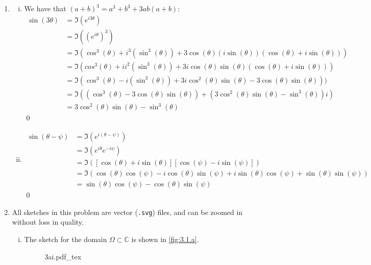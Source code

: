 \documentclass[a4paper, titlepage, DIV=14]{scrartcl}
\newcommand{\incfig}[1]{%
    \def\svgwidth{0.8\columnwidth}
    {#1.pdf_tex}
}
\begin{document}
\begin{enumerate}
        \item 
        \begin{enumerate}[i)]
            \item We have that $(a+b)^{3} = a^{3} + b^{3} +3ab(a+b)$:
            \begin{align*}
                \sin(3\theta) &= \Im(e^{i3\theta}) \\
                    &= \Im((e^{i\theta})^{3}) \\
                    &= \Im(\cos^{3}(\theta)+i^{3}(\sin^{3}(\theta)) 
                        + 3\cos(\theta)(i\sin(\theta))(\cos(\theta)+i\sin(\theta))) \\
                    &= \Im(cos^{3}(\theta)+ii^{2}(\sin^{3}(\theta)) 
                        + 3i\cos(\theta)\sin(\theta)(\cos(\theta)+i\sin(\theta))) \\
                    &= \Im(\cos^{3}(\theta)-i(\sin^{3}(\theta)) 
                        + 3i\cos^{2}(\theta)\sin(\theta) - 3\cos(\theta)\sin(\theta))) \\
                    &= \Im((\cos^{3}(\theta)-3\cos(\theta)\sin(\theta))+(3\cos^{2}(\theta)\sin(\theta)-\sin^{3}(\theta))i) \\
                    &= 3\cos^{2}(\theta)\sin(\theta)-\sin^{3}(\theta)
            \end{align*} \qed

            \item 
            \begin{align*}
                \sin(\theta - \psi) &= \Im(e^{i(\theta-\psi)}) \\
                    &= \Im(e^{i\theta}e^{-i\psi}) \\
                    &= \Im([\cos(\theta)+i\sin(\theta)][\cos(\psi)-i\sin(\psi)]) \\
                    &= \Im(\cos(\theta)\cos(\psi) - i\cos(\theta)\sin(\psi) 
                        + i\sin(\theta)\cos(\psi) + \sin(\theta)\sin(\psi)) \\
                    &= \sin(\theta)\cos(\psi)-\cos(\theta)\sin(\psi)
            \end{align*} \qed
        \end{enumerate} 

        \item All sketches in this problem are vector (\verb_.svg_) files, and can be zoomed in without loss
        in quality.
        \begin{enumerate}[i)]
            \item The sketch for the domain $\Omega \subset \mathbb{C}$ is shown in \autoref{fig:3.1.a}.
            \begin{figure}[!h]
                \centering
                \incfig{3ai}
                \caption{}
                \label{fig:3.1.a}
            \end{figure}
            

\end{enumerate}
\end{enumerate}
\end{document}
